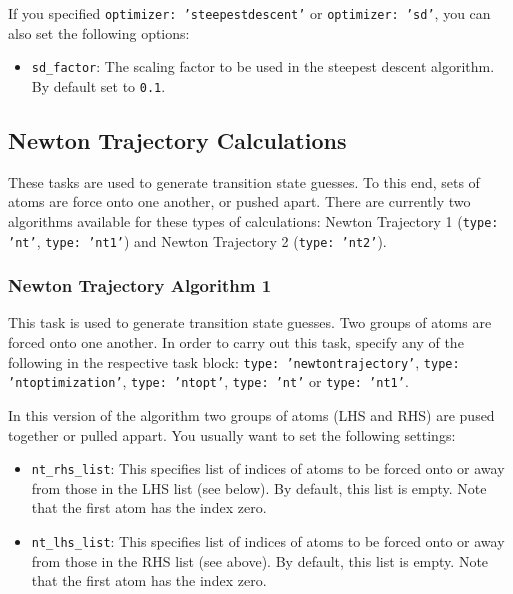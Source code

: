 \documentclass[]{tufte-book}
\begin{document}
If you specified \texttt{optimizer: 'steepestdescent'} or \texttt{optimizer: 'sd'}, you can also set the following options:
\begin{itemize}
\item \texttt{sd\_factor}: The scaling factor to be used in the steepest descent algorithm. By default set to \texttt{0.1}.
\end{itemize}

\subsection{Newton Trajectory Calculations}

These tasks are used to generate transition state guesses.
To this end, sets of atoms are force onto one another, or pushed apart.
There are currently two algorithms available for these types of calculations:
Newton Trajectory 1 (\texttt{type: 'nt'}, \texttt{type: 'nt1'}) and Newton Trajectory 2 (\texttt{type: 'nt2'}).

\subsubsection{Newton Trajectory Algorithm 1}

This task is used to generate transition state guesses. Two groups of atoms are forced onto one another.
In order to carry out this task, specify any of the following in the respective task block:
\texttt{type: 'newtontrajectory'}, \texttt{type: 'ntoptimization'}, \texttt{type: 'ntopt'}, \texttt{type: 'nt'} or \texttt{type: 'nt1'}.

In this version of the algorithm two groups of atoms (LHS and RHS) are pused together or pulled appart.
You usually want to set the following settings:
\begin{itemize}
\item \texttt{nt\_rhs\_list}: This specifies list of indices of atoms to be forced onto or away from those
in the LHS list (see below). By default, this list is empty. Note that the first atom has the index zero.
\item \texttt{nt\_lhs\_list}: This specifies list of indices of atoms to be forced onto or away from those
in the RHS list (see above). By default, this list is empty. Note that the first atom has the index zero.
\end{itemize}
\end{document}
